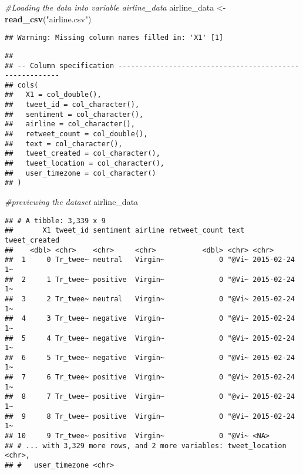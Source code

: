 \documentclass[
]{article}
\newenvironment{Shaded}{\begin{snugshade}}{\end{snugshade}}
\newcommand{\CommentTok}[1]{\textcolor[rgb]{0.56,0.35,0.01}{\textit{#1}}}
\newcommand{\KeywordTok}[1]{\textcolor[rgb]{0.13,0.29,0.53}{\textbf{#1}}}
\newcommand{\NormalTok}[1]{#1}
\newcommand{\StringTok}[1]{\textcolor[rgb]{0.31,0.60,0.02}{#1}}
\begin{document}
\begin{Shaded}
\begin{Highlighting}[]
\CommentTok{#Loading the data into variable airline_data}
\NormalTok{airline_data <-}\StringTok{ }\KeywordTok{read_csv}\NormalTok{(}\StringTok{"airline.csv"}\NormalTok{)}
\end{Highlighting}
\end{Shaded}

\begin{verbatim}
## Warning: Missing column names filled in: 'X1' [1]
\end{verbatim}

\begin{verbatim}
## 
## -- Column specification --------------------------------------------------------
## cols(
##   X1 = col_double(),
##   tweet_id = col_character(),
##   sentiment = col_character(),
##   airline = col_character(),
##   retweet_count = col_double(),
##   text = col_character(),
##   tweet_created = col_character(),
##   tweet_location = col_character(),
##   user_timezone = col_character()
## )
\end{verbatim}

\begin{Shaded}
\begin{Highlighting}[]
\CommentTok{#previewing the dataset}
\NormalTok{airline_data }
\end{Highlighting}
\end{Shaded}

\begin{verbatim}
## # A tibble: 3,339 x 9
##       X1 tweet_id sentiment airline retweet_count text  tweet_created
##    <dbl> <chr>    <chr>     <chr>           <dbl> <chr> <chr>        
##  1     0 Tr_twee~ neutral   Virgin~             0 "@Vi~ 2015-02-24 1~
##  2     1 Tr_twee~ positive  Virgin~             0 "@Vi~ 2015-02-24 1~
##  3     2 Tr_twee~ neutral   Virgin~             0 "@Vi~ 2015-02-24 1~
##  4     3 Tr_twee~ negative  Virgin~             0 "@Vi~ 2015-02-24 1~
##  5     4 Tr_twee~ negative  Virgin~             0 "@Vi~ 2015-02-24 1~
##  6     5 Tr_twee~ negative  Virgin~             0 "@Vi~ 2015-02-24 1~
##  7     6 Tr_twee~ positive  Virgin~             0 "@Vi~ 2015-02-24 1~
##  8     7 Tr_twee~ positive  Virgin~             0 "@vi~ 2015-02-24 1~
##  9     8 Tr_twee~ positive  Virgin~             0 "@Vi~ 2015-02-24 1~
## 10     9 Tr_twee~ positive  Virgin~             0 "@Vi~ <NA>         
## # ... with 3,329 more rows, and 2 more variables: tweet_location <chr>,
## #   user_timezone <chr>
\end{verbatim}
\end{document}
